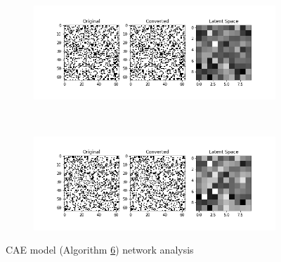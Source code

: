 \begin{figure}[h!]
    \centerfloat
    \begin{subfigure}[b]{1.25\linewidth}
        \includegraphics[width=\linewidth]{images/cae_online_lstm/caelstm_section_cae_training_uniform_random_fill_10000_model_network_analysis_0.png}
    \end{subfigure}
    \\[-1.5cm]
    \begin{subfigure}[b]{1.25\linewidth}
        \includegraphics[width=\linewidth]{images/cae_online_lstm/caelstm_section_cae_training_uniform_random_fill_10000_model_network_analysis_1.png}
    \end{subfigure}
    
    \caption{CAE model (Algorithm \hyperref[tab: app_evalalgorithms]{6}) network analysis}
    \label{fig: cae_6_net_analysis}
\end{figure}

\pagebreak

